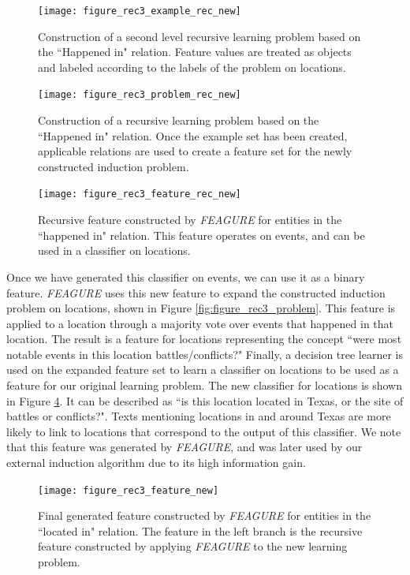 \documentclass[twoside,11pt]{article}
\theoremstyle{definition}
\begin{document}
\begin{figure}[!h]
	\centering
	\texttt{[image: figure\_rec3\_example\_rec\_new]}
	\caption{Construction of a second level recursive learning problem based on the ``Happened in" relation. Feature values are treated as objects and labeled according to the labels of the problem on locations.}
	\label{fig:figure_rec3_example_rec}
\end{figure}

\begin{figure}[!h]
	\centering
	\texttt{[image: figure\_rec3\_problem\_rec\_new]}
	\caption{Construction of a recursive learning problem based on the ``Happened in" relation. Once the example set has been created, applicable relations are used to create a feature set for the newly constructed induction problem.}
	\label{fig:figure_rec3_problem_rec}
\end{figure}

\begin{figure}[!h]
	\centering
	\texttt{[image: figure\_rec3\_feature\_rec\_new]}
	\caption{Recursive feature constructed by \emph{FEAGURE} for entities in the ``happened in" relation. This feature operates on events, and can be used in a classifier on locations.}
	\label{fig:figure_rec3_feature}
\end{figure}

Once we have generated this classifier on events, we can use it as a binary feature. \emph{FEAGURE} uses this new feature to expand the constructed induction problem on locations, shown in Figure \ref{fig:figure_rec3_problem}.
This feature is applied to a location through a majority vote over events that happened in that location. The result is a feature for locations representing the concept ``were most notable events in this location battles/conflicts?"
Finally, a decision tree learner is used on the expanded feature set to learn a classifier on locations to be used as a feature for our original learning problem. The new classifier for locations is shown in Figure \ref{fig:figure_rec3_feature_full}. It can be described as ``is this location located in Texas, or the site of battles or conflicts?".
Texts mentioning locations in and around Texas are more likely to link to locations that correspond to the output of this classifier.
We note that this feature was generated by \emph{FEAGURE}, and was later used by our external induction algorithm due to its high information gain. 

\begin{figure}[!h]
	\centering
	\texttt{[image: figure\_rec3\_feature\_new]}
	\caption{Final generated feature constructed by \emph{FEAGURE} for entities in the ``located in" relation. The feature in the left branch is the recursive feature constructed by applying \emph{FEAGURE} to the new learning problem.}
	\label{fig:figure_rec3_feature_full}
\end{figure}
\end{document}
